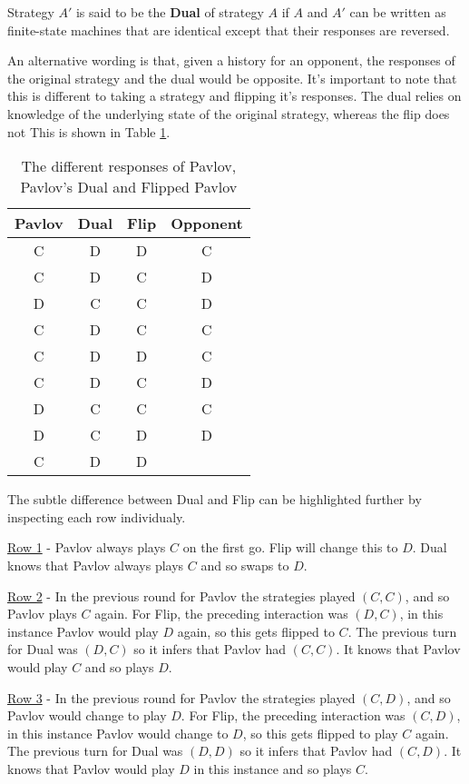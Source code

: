 \begin{definition}\label{def:dual}
Strategy $A'$ is said to be the \textbf{Dual} of strategy $A$ if $A$ and $A'$ can be written as finite-state machines that are identical except that their responses are reversed.
\end{definition}

An alternative wording is that, given a history for an opponent, the responses of the original strategy and the dual would be opposite.
It's important to note that this is different to taking a strategy and flipping it's responses.
The dual relies on knowledge of the underlying state of the original strategy, whereas the flip does not
This is shown in Table \ref{tab:strat-dual-flip}.

\begin{table}[htbp]
\centering
\begin{tabular}{c c  c | c}
Pavlov & Dual & Flip & Opponent \\
\hline
C & D & D & C\\
C & D & C & D\\
D & C & C & D\\
C & D & C & C\\
C & D & D & C\\
C & D & C & D\\
D & C & C & C\\
D & C & D & D\\
C & D & D &
\end{tabular}
\caption{The different responses of Pavlov, Pavlov's Dual and Flipped Pavlov}
\label{tab:strat-dual-flip}
\end{table}

The subtle difference between Dual and Flip can be highlighted further by inspecting each row individualy.

\underline{Row 1} - Pavlov always plays $C$ on the first go.
Flip will change this to $D$.
Dual knows that Pavlov always plays $C$ and so swaps to $D$.

\underline{Row 2} - In the previous round for Pavlov the strategies played $(C, C)$, and so Pavlov plays $C$ again.
For Flip, the preceding interaction was $(D, C)$, in this instance Pavlov would play $D$ again, so this gets flipped to $C$.
The previous turn for Dual was $(D, C)$ so it infers that Pavlov had $(C, C)$.
It knows that Pavlov would play $C$ and so plays $D$.

\underline{Row 3} - In the previous round for Pavlov the strategies played $(C, D)$, and so Pavlov would change to play $D$.
For Flip, the preceding interaction was $(C, D)$, in this instance Pavlov would change to $D$, so this gets flipped to play $C$ again.
The previous turn for Dual was $(D, D)$ so it infers that Pavlov had $(C, D)$.
It knows that Pavlov would play $D$ in this instance and so plays $C$.



